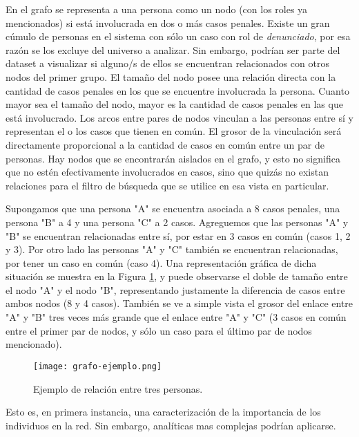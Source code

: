 En el grafo se representa a una persona como un nodo (con los roles ya mencionados) si está involucrada en dos o más casos penales. Existe un gran cúmulo de personas en el sistema con sólo un caso con rol de \textit{denunciado}, por esa razón se los excluye del universo a analizar. Sin embargo, podrían ser parte del dataset a visualizar si alguno/s de ellos se encuentran relacionados con otros nodos del primer grupo. El tamaño del nodo posee una relación directa con la cantidad de casos penales en los que se encuentre involucrada la persona. Cuanto mayor sea el tamaño del nodo, mayor es la cantidad de casos penales en las que está involucrado.
Los arcos entre pares de nodos vinculan a las personas entre sí y representan el o los casos que tienen en común. El grosor de la vinculación será directamente proporcional a la cantidad de casos en común entre un par de personas. Hay nodos que se encontrarán aislados en el grafo, y esto no significa que no estén efectivamente involucrados en casos, sino que quizás no existan relaciones para el filtro de búsqueda que se utilice en esa vista en particular.

Supongamos que una persona "A" se encuentra asociada a 8 casos penales, una persona "B" a 4 y una persona "C" a 2 casos. Agreguemos que las personas "A" y "B" se encuentran relacionadas entre sí, por estar en 3 casos en común (casos 1, 2 y 3). Por otro lado las personas "A" y "C" también se encuentran relacionadas, por tener un caso en común (caso 4).  Una representación gráfica de dicha situación se muestra en la Figura \ref{fig:grafode2}, y puede observarse el doble de tamaño entre el nodo "A" y el nodo "B", representando justamente la diferencia de casos entre ambos nodos (8 y 4 casos). También se ve a simple vista el grosor del enlace entre "A" y "B" tres veces más grande que el enlace entre "A" y "C" (3 casos en común entre el primer par de nodos, y sólo un caso para el último par de nodos mencionado). 


\vspace{-15pt}
\begin{figure}
	\centering
	\texttt{[image: grafo-ejemplo.png]}
	\caption{Ejemplo de relación entre tres personas.} 
	\label{fig:grafode2}
\end{figure}
\vspace{-5pt}

Esto es, en primera instancia, una caracterización de la importancia de los individuos en la red.
Sin embargo, analíticas mas complejas podrían aplicarse.